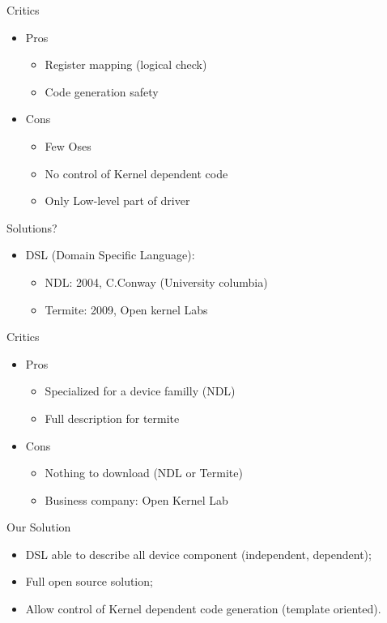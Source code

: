 \documentclass[xcolor={usenames,svgnames}]{beamer}
\begin{document}
\begin{frame}{Critics}
\begin{itemize}
\item Pros
\begin{itemize}
\item Register mapping (logical check)
\item Code generation safety
\end{itemize}
\item Cons
\begin{itemize}
\item Few Oses
\item No control of Kernel dependent code
\item Only Low-level part of driver
\end{itemize}
\end{itemize}
\end{frame}

\begin{frame}{Solutions?}
\begin{itemize}
\item DSL (Domain Specific Language):
\begin{itemize}
\item NDL: 2004, C.Conway (University columbia)
\item Termite: 2009, Open kernel Labs
\end{itemize}
\end{itemize}
\end{frame}

\begin{frame}{Critics}
\begin{itemize}
\item Pros
\begin{itemize}
\item Specialized for a device familly (NDL)
\item Full description for termite
\end{itemize}
\item Cons
\begin{itemize}
\item Nothing to download (NDL or Termite)
\item Business company: Open Kernel Lab
\end{itemize}
\end{itemize}
\end{frame}

\begin{frame}{Our Solution}
\begin{itemize}
\item DSL able to describe all device component (independent, dependent);
\item Full open source solution;
\item Allow control of Kernel dependent code generation (template oriented).
\end{itemize}
\end{frame}
\end{document}
